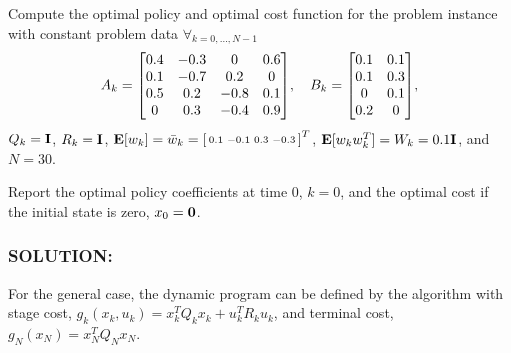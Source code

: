 \documentclass[]{article}
\newcommand{\Solution}{\subsubsection*{\textbf{SOLUTION:}}}
\begin{document}
Compute the optimal policy and optimal cost function for the problem instance with constant problem data $\forall_{k=0,\dots,N-1}$ \[
    A_k = \mqty[
        0.4 & -0.3 & 0 & 0.6\\
        0.1 & -0.7 & 0.2 & 0\\
        0.5 & 0.2 &-0.8 & 0.1\\
        0 & 0.3 & -0.4 & 0.9
    ], \quad 
    B_k = \mqty[
        0.1 & 0.1\\
        0.1 & 0.3\\
        0 & 0.1\\
        0.2 & 0
    ],
\]
$Q_k = \vb{I}$, $R_k = \vb{I}$, $\mathbf{E} [w_k] = \bar{w}_k = \smqty[0.1&-0.1&0.3&-0.3]^T$, $\mathbf{E}[w_k w_k^T] = W_k = 0.1 \vb{I}$, and $N = 30$.

Report the optimal policy coefficients at time 0, $k=0$, and the optimal cost if the initial state is zero, $x_0 = \vb{0}$.

\Solution
For the general case, the dynamic program can be defined by the algorithm with stage cost, $g_{k}(x_k,u_k) = x_k^T Q_k x_k + u_k^T R_k u_k$, and terminal cost, $g_{N}(x_N) = x_N^T Q_N x_N$.









% 
% 

% 
% 
\end{document}

